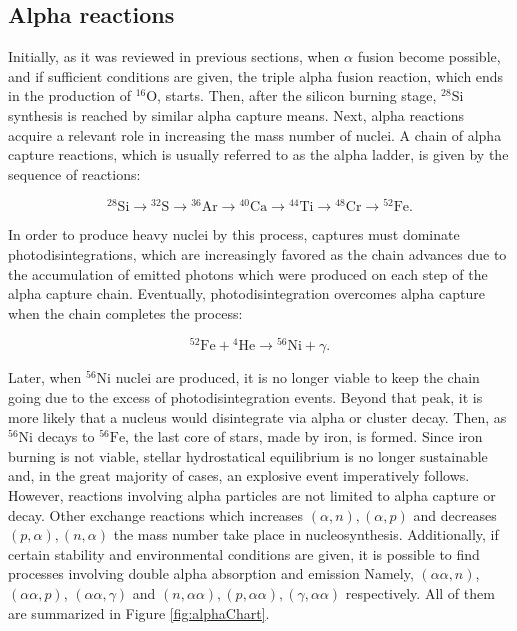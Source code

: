 \documentclass[openany]{book}
\begin{document}
\subsection{Alpha reactions} \label{sub:alphaProcesses}

Initially, as it was reviewed in previous sections, when $\alpha$ fusion become possible, and if sufficient conditions are given, the triple alpha fusion reaction, which ends in the production of $\mathrm{{}^{16}O}$, starts. Then, after the silicon burning stage, $\mathrm{{}^{28}Si}$ synthesis is reached by similar alpha capture means. Next, alpha reactions acquire a relevant role in increasing the mass number of nuclei. A chain of alpha capture reactions, which is usually referred to as the alpha ladder, is given by the sequence of reactions:

\begin{equation}  \label{eq:reaction_alphaLatter}
	\mathrm{{}^{28}Si \rightarrow {}^{32}S \rightarrow {}^{36}Ar \rightarrow {}^{40}Ca \rightarrow {}^{44}Ti  \rightarrow {}^{48} Cr \rightarrow {}^{52}Fe}.
\end{equation}

In order to produce heavy nuclei by this process, captures must dominate photodisintegrations, which are increasingly favored as the chain advances due to the accumulation of emitted photons which were produced on each step of the alpha capture chain. Eventually, photodisintegration overcomes alpha capture when the chain completes the process:

\begin{equation}  \label{eq:reaction_52Fealpha}
	\mathrm{{}^{52}Fe +{}^{4}He \rightarrow {}^{56}Ni} + \gamma.
\end{equation}

Later, when $\mathrm{{}^{56}Ni}$ nuclei are produced, it is no longer viable to keep the chain going due to the excess of photodisintegration events. Beyond that peak, it is more likely that a nucleus would disintegrate via alpha or cluster decay. Then, as  $\mathrm{{}^{56}Ni}$ decays to $\mathrm{{}^{56}Fe}$, the last core of stars, made by iron, is formed. Since iron burning is not viable, stellar hydrostatical equilibrium is no longer sustainable and, in the great majority of cases, an explosive event imperatively follows. \\

However, reactions involving alpha particles are not limited to alpha capture or decay. Other exchange reactions which increases $(\alpha, n), (\alpha, p)$ and decreases $(p, \alpha), (n, \alpha)$ the mass number take place in nucleosynthesis. Additionally, if certain stability and environmental conditions are given,  it is possible to find processes involving double alpha absorption and emission  Namely, $(\alpha \alpha, n)$, $(\alpha \alpha, p)$, $(\alpha \alpha, \gamma)$ and $(n, \alpha \alpha), (p, \alpha \alpha), (\gamma, \alpha \alpha)$ respectively. All of them are summarized in Figure \ref{fig:alphaChart}.
\end{document}
